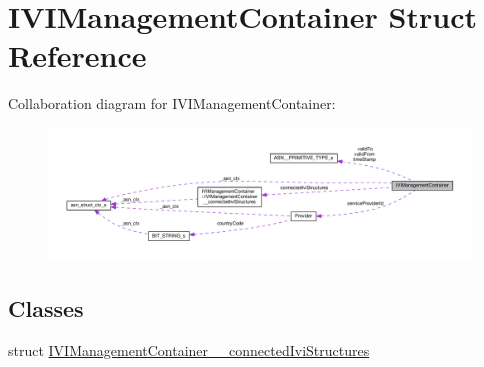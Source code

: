 \hypertarget{structIVIManagementContainer}{}\section{I\+V\+I\+Management\+Container Struct Reference}
\label{structIVIManagementContainer}


Collaboration diagram for I\+V\+I\+Management\+Container\+:\nopagebreak
\begin{figure}[H]
\begin{center}
\leavevmode
\includegraphics[width=350pt]{structIVIManagementContainer__coll__graph}
\end{center}
\end{figure}
\subsection*{Classes}
\begin{DoxyCompactItemize}
\item 
struct \hyperlink{structIVIManagementContainer_1_1IVIManagementContainer____connectedIviStructures}{I\+V\+I\+Management\+Container\+\_\+\+\_\+connected\+Ivi\+Structures}
\end{DoxyCompactItemize}
